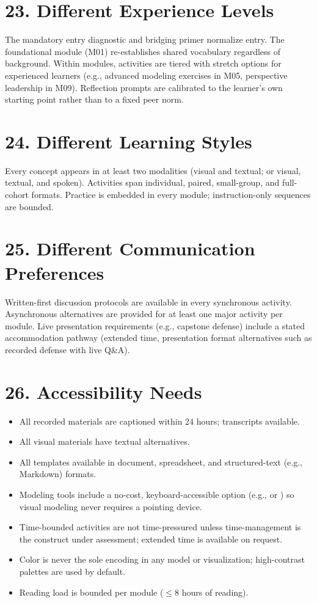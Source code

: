 \documentclass[11pt,letterpaper,oneside]{report}
\begin{document}

\section*{23. Different Experience Levels}
The mandatory entry diagnostic and bridging primer normalize entry. The foundational module (M01) re-establishes shared vocabulary regardless of background. Within modules, activities are tiered with stretch options for experienced learners (e.g., advanced modeling exercises in M05, perspective leadership in M09). Reflection prompts are calibrated to the learner's own starting point rather than to a fixed peer norm.

\section*{24. Different Learning Styles}
Every concept appears in at least two modalities (visual and textual; or visual, textual, and spoken). Activities span individual, paired, small-group, and full-cohort formats. Practice is embedded in every module; instruction-only sequences are bounded.

\section*{25. Different Communication Preferences}
Written-first discussion protocols are available in every synchronous activity. Asynchronous alternatives are provided for at least one major activity per module. Live presentation requirements (e.g., capstone defense) include a stated accommodation pathway (extended time, presentation format alternatives such as recorded defense with live Q\&A).

\section*{26. Accessibility Needs}
\begin{itemize}
  \item All recorded materials are captioned within 24 hours; transcripts available.
  \item All visual materials have textual alternatives.
  \item All templates available in document, spreadsheet, and structured-text (e.g., Markdown) formats.
  \item Modeling tools include a no-cost, keyboard-accessible option (e.g.,  or ) so visual modeling never requires a pointing device.
  \item Time-bounded activities are not time-pressured unless time-management is the construct under assessment; extended time is available on request.
  \item Color is never the sole encoding in any model or visualization; high-contrast palettes are used by default.
  \item Reading load is bounded per module ($\leq$8 hours of reading).
\end{itemize}
\end{document}
